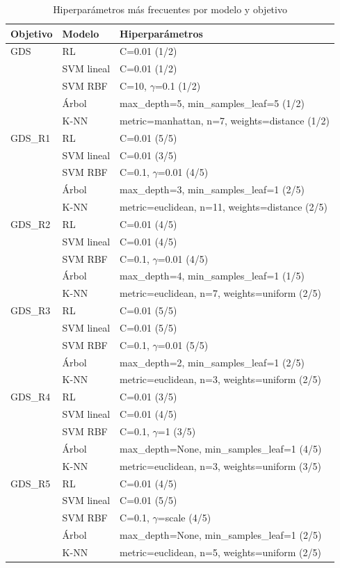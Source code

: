 \documentclass[conference]{IEEEtran}
\begin{document}
\begin{table}[h]
\centering
\caption{Hiperparámetros más frecuentes por modelo y objetivo}
\label{tab:params}
\begin{tabular}{lll}
\toprule
\textbf{Objetivo} & \textbf{Modelo} & \textbf{Hiperparámetros} \\
\midrule
GDS & RL & C=0.01 (1/2) \\
 & SVM lineal & C=0.01 (1/2) \\
 & SVM RBF & C=10, $\gamma$=0.1 (1/2) \\
 & Árbol & max\_depth=5, min\_samples\_leaf=5 (1/2) \\
 & K-NN & metric=manhattan, n=7, weights=distance (1/2) \\
\midrule
GDS\_R1 & RL & C=0.01 (5/5) \\
 & SVM lineal & C=0.01 (3/5) \\
 & SVM RBF & C=0.1, $\gamma$=0.01 (4/5) \\
 & Árbol & max\_depth=3, min\_samples\_leaf=1 (2/5) \\
 & K-NN & metric=euclidean, n=11, weights=distance (2/5) \\
\midrule
GDS\_R2 & RL & C=0.01 (4/5) \\
 & SVM lineal & C=0.01 (4/5) \\
 & SVM RBF & C=0.1, $\gamma$=0.01 (4/5) \\
 & Árbol & max\_depth=4, min\_samples\_leaf=1 (1/5) \\
 & K-NN & metric=euclidean, n=7, weights=uniform (2/5) \\
\midrule
GDS\_R3 & RL & C=0.01 (5/5) \\
 & SVM lineal & C=0.01 (5/5) \\
 & SVM RBF & C=0.1, $\gamma$=0.01 (5/5) \\
 & Árbol & max\_depth=2, min\_samples\_leaf=1 (2/5) \\
 & K-NN & metric=euclidean, n=3, weights=uniform (2/5) \\
\midrule
GDS\_R4 & RL & C=0.01 (3/5) \\
 & SVM lineal & C=0.01 (4/5) \\
 & SVM RBF & C=0.1, $\gamma$=1 (3/5) \\
 & Árbol & max\_depth=None, min\_samples\_leaf=1 (4/5) \\
 & K-NN & metric=euclidean, n=3, weights=uniform (3/5) \\
\midrule
GDS\_R5 & RL & C=0.01 (4/5) \\
 & SVM lineal & C=0.01 (5/5) \\
 & SVM RBF & C=0.1, $\gamma$=scale (4/5) \\
 & Árbol & max\_depth=None, min\_samples\_leaf=1 (2/5) \\
 & K-NN & metric=euclidean, n=5, weights=uniform (2/5) \\
\bottomrule
\end{tabular}
\end{table}
\end{document}
